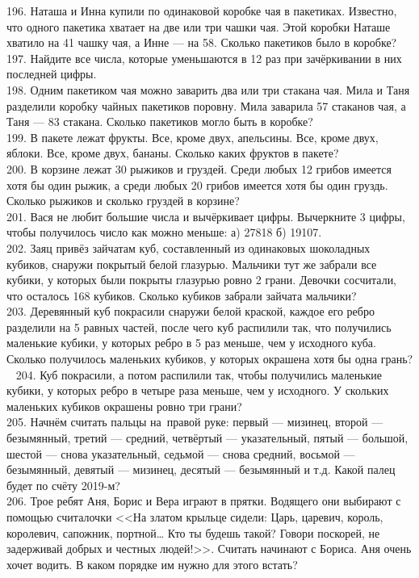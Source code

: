\documentclass[12pt]{article}
\begin{document}
196. Наташа и Инна купили по одинаковой коробке чая в пакетиках. Известно, что одного пакетика хватает на две или три чашки чая. Этой коробки Наташе хватило на 41 чашку чая, а Инне --- на 58. Сколько пакетиков было в коробке?\\
197. Найдите все числа, которые уменьшаются в 12 раз при зачёркивании в них последней цифры.\\
198. Одним пакетиком чая можно заварить два или три стакана чая. Мила и Таня разделили коробку чайных пакетиков поровну. Мила заварила 57 стаканов чая, а Таня --- 83 стакана. Сколько пакетиков могло быть в коробке?\\
199. В пакете лежат фрукты. Все, кроме двух, апельсины. Все, кроме двух, яблоки. Все, кроме двух, бананы. Сколько каких фруктов в пакете?\\
200. В корзине лежат 30 рыжиков и груздей. Среди любых 12 грибов имеется хотя бы один рыжик, а среди любых 20 грибов имеется хотя бы один груздь. Сколько рыжиков и сколько груздей в корзине?\\
201. Вася не любит большие числа и вычёркивает цифры. Вычеркните 3 цифры, чтобы получилось число как можно меньше: а) 27818 б) 19107.\\
202. Заяц привёз зайчатам куб, составленный из одинаковых шоколадных кубиков, снаружи покрытый белой глазурью. Мальчики тут же забрали все кубики, у которых были покрыты глазурью ровно 2 грани. Девочки сосчитали, что осталось 168 кубиков. Сколько кубиков забрали зайчата мальчики?\\
203. Деревянный куб покрасили снаружи белой краской, каждое его ребро разделили на 5 равных частей, после чего куб распилили так, что получились маленькие кубики, у которых ребро в 5 раз меньше, чем у исходного куба. Сколько получилось маленьких кубиков, у которых окрашена хотя бы одна грань?\\ 
204. Куб покрасили, а потом распилили так, чтобы получились маленькие кубики, у которых ребро в четыре раза меньше, чем у исходного. У скольких маленьких кубиков окрашены ровно три грани?\\
205. Начнём считать пальцы на правой руке: первый --- мизинец, второй --- безымянный, третий --- средний, четвёртый --- указательный, пятый --- большой, шестой --- снова указательный, седьмой --- снова средний, восьмой --- безымянный, девятый --- мизинец, десятый --- безымянный и т.д. Какой палец будет по счёту 2019-м?\\
206. Трое ребят Аня, Борис и Вера играют в прятки. Водящего они выбирают с помощью считалочки <<На златом крыльце сидели: Царь, царевич, король, королевич, сапожник, портной… Кто ты будешь такой? Говори поскорей, не задерживай добрых и честных людей!>>. Считать начинают с Бориса. Аня очень хочет водить.  В каком порядке им нужно для этого встать?\\
\end{document}
